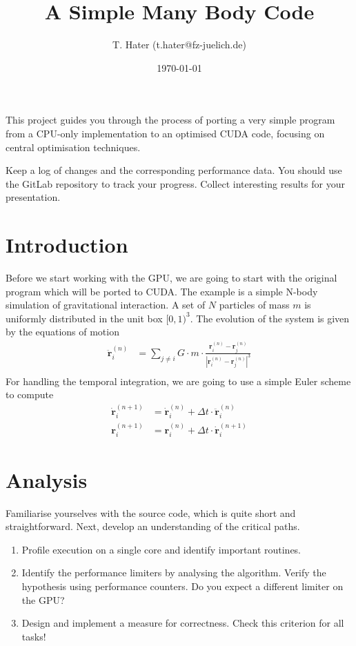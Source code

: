 \documentclass{tufte-handout}
\title{A Simple Many Body Code}
\author{T. Hater (t.hater@fz-juelich.de)}
\date{\today}
\begin{document}
\maketitle

This project guides you through the process of porting a very simple
program from a CPU-only implementation to an optimised CUDA code,
focusing on central optimisation techniques.

Keep a log of changes and the corresponding performance data. You should
use the GitLab repository to track your progress. Collect interesting results
for your presentation.

\section{Introduction}

Before we start working with the GPU, we are going to start with the
original program which will be ported to CUDA. The example is a simple
N-body simulation of gravitational interaction. A set of $N$
particles of mass $m$
is uniformly distributed in the unit box $[0,1)^3$.
The evolution of the system is given by the equations of motion
\begin{align*}
  \ddot{\mathbf{r}}^{(n)}_i &= \sum_{j \neq i} G\cdot m\cdot\frac{\mathbf{r}_i^{(n)} - \mathbf{r}_j^{(n)}}{\left|\mathbf{r}_i^{(n)} - \mathbf{r}_j^{(n)}\right|^3} \\
\end{align*}
For handling the temporal integration, we are going to use a simple
Euler scheme to compute
\begin{align*}
  \dot{\mathbf{r}}^{(n+1)}_i &= \dot{\mathbf{r}}^{(n)}_i + \Delta t \cdot \ddot{\mathbf{r}}_i^{(n)} \\
  \mathbf{r}^{(n+1)}_i &= \mathbf{r}^{(n)}_i + \Delta t \cdot \dot{\mathbf{r}}^{(n+1)}_i
\end{align*}

\section{Analysis}
Familiarise yourselves with the source code, which is quite short and
straightforward. Next, develop an understanding of the critical paths. 

\begin{enumerate}
\item Profile execution on a single core and identify important
  routines.
\item Identify the performance limiters by analysing the algorithm. Verify the hypothesis
  using performance counters. Do you expect a different limiter on the GPU?
\item Design and implement a measure for correctness. Check this
  criterion for all tasks!
\end{enumerate}
\end{document}
